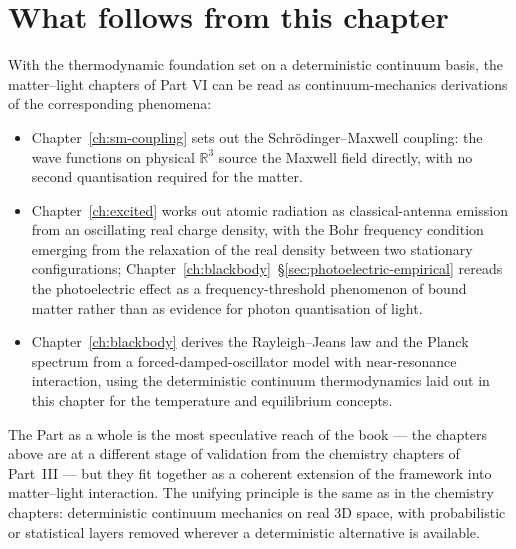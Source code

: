 \section{What follows from this chapter}\label{sec:thermo-follows}

With the thermodynamic foundation set on a deterministic continuum basis, the matter--light chapters of Part VI can be read as continuum-mechanics derivations of the corresponding phenomena:

\begin{itemize}
\item Chapter~\ref{ch:sm-coupling} sets out the Schr\"odinger--Maxwell coupling: the wave functions on physical $\mathbb{R}^3$ source the Maxwell field directly, with no second quantisation required for the matter.
\item Chapter~\ref{ch:excited} works out atomic radiation as classical-antenna emission from an oscillating real charge density, with the Bohr frequency condition emerging from the relaxation of the real density between two stationary configurations; Chapter~\ref{ch:blackbody}~\S\ref{sec:photoelectric-empirical} rereads the photoelectric effect as a frequency-threshold phenomenon of bound matter rather than as evidence for photon quantisation of light.
\item Chapter~\ref{ch:blackbody} derives the Rayleigh--Jeans law and the Planck spectrum from a forced-damped-oscillator model with near-resonance interaction, using the deterministic continuum thermodynamics laid out in this chapter for the temperature and equilibrium concepts.
\end{itemize}

The Part as a whole is the most speculative reach of the book --- the chapters above are at a different stage of validation from the chemistry chapters of Part~III --- but they fit together as a coherent extension of the framework into matter--light interaction. The unifying principle is the same as in the chemistry chapters: deterministic continuum mechanics on real 3D space, with probabilistic or statistical layers removed wherever a deterministic alternative is available.

